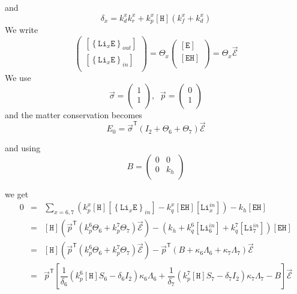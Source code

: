 \documentclass[aps,onecolumn,11pt]{revtex4}
\newcommand{\mychem}[1]{\mathtt{#1}}
\newcommand{\myconc}[1]{\left\lbrack{#1}\right\rbrack}
\newcommand{\LiEin}[1]{\myconc{\left\lbrace\mychem{Li}_{#1}\mychem{E}\right\rbrace_{in}}}
\newcommand{\LiEout}[1]{\myconc{\left\lbrace\mychem{Li}_{#1}\mychem{E}\right\rbrace_{out}}}
\newcommand{\LiIn}[1]{\myconc{\mychem{Li}_{#1}^{in}}}
\newcommand{\EHin}{\myconc{\mychem{EH}}}
\newcommand{\Eout}{\myconc{\mychem{E}}}
\newcommand{\Hin}{\myconc{\mychem{H}}}
\newcommand{\mytrn}[1]{{#1}^{\mathsf{T}}}
\begin{document}
and
\begin{equation}
\delta_x = k_d^x k_r^x + k_p^x \Hin \left(k_f^x+k_d^x\right)
\end{equation}
We write
\begin{equation}
	\begin{pmatrix}
	\LiEout{x}\\
	\LiEin{x}\\
\end{pmatrix}
= 
\Theta_x 
\begin{pmatrix}
	\Eout\\
	\EHin\\
\end{pmatrix}
=\Theta_x \vec{\mathcal{E}}
\end{equation}
We use 
\begin{equation}
	\vec{\sigma} = 
	\begin{pmatrix}
	1\\
	1\\
	\end{pmatrix}, \;\; 
	\vec{p} = 
	\begin{pmatrix}
	0\\
	1\\
	\end{pmatrix}
\end{equation}
and the matter conservation becomes
\begin{equation}
	E_0 = \mytrn{\vec{\sigma}}\left(I_2+\Theta_6+\Theta_7\right) \vec{\mathcal{E}}
\end{equation}

and using
\begin{equation}
	B = 
	\begin{pmatrix}
	0 & 0\\
	0 & k_h\\
	\end{pmatrix}
\end{equation}

we get
\begin{equation}
	\begin{array}{rcl}
		0 & = & \sum_{x=6,7}\left( k_p^x \Hin \LiEin{x} - k_q^x \EHin \LiIn{x}\right) - k_h \EHin\\
		  & = &
			\Hin \left(
			\mytrn{\vec{p}} 
			\left(
			k_p^6\Theta_6 + k_p^7 \Theta_7
			\right)
			\vec{\mathcal{E}}
			\right)
			-\left(k_h + k_q^6 \LiIn{6} + k_q^7 \LiIn{7} \right) \EHin
		  \\
		  & = & \Hin \left(
			\mytrn{\vec{p}} 
			\left(
			k_p^6\Theta_6 + k_p^7 \Theta_7
			\right)
			\vec{\mathcal{E}}
			\right)
			-\mytrn{\vec{p}} \left(B+\kappa_6\Lambda_6+\kappa_7\Lambda_7\right) \vec{\mathcal{E}}
\\
 & = & 
 \mytrn{\vec{p}} \left\lbrack
  \dfrac{1}{\delta_6} \left(k_p^6 \Hin S_6 -\delta_6I_2\right)\kappa_6\Lambda_6 
 +\dfrac{1}{\delta_7} \left(k_p^7 \Hin S_7 -\delta_7I_2\right)\kappa_7\Lambda_7 
 - B
 \right\rbrack \vec{\mathcal{E}}
 \\
	\end{array}
\end{equation}
\end{document}

